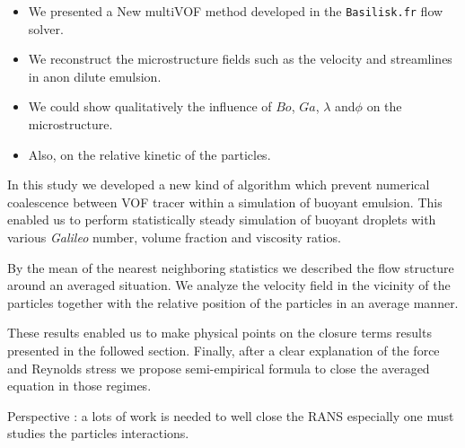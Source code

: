 

\begin{itemize}
    \item We presented a New multiVOF method developed in the \texttt{Basilisk.fr} flow solver. 
    \item We reconstruct the microstructure fields such as the velocity and streamlines in  anon dilute emulsion. 
    \item We could show qualitatively the influence of $Bo$, $Ga$, $\lambda$ and$\phi$ on the microstructure.
    \item Also, on the relative kinetic of the particles.  
\end{itemize}

In this study we developed a new kind of algorithm which prevent numerical coalescence between VOF tracer within a simulation of buoyant emulsion. 
This enabled us to perform statistically steady simulation of buoyant droplets with various \textit{Galileo} number, volume fraction and viscosity ratios. 

By the mean of the nearest neighboring statistics we described the flow structure around an averaged situation. 
We analyze the velocity field in the vicinity of the particles together with the relative position of the particles in an average manner. 

These results enabled us to make physical points on the closure terms results presented in the followed section. 
Finally, after a clear explanation of the force and Reynolds stress we propose semi-empirical formula to close the averaged equation in those regimes. 

Perspective : a lots of work is needed to well close the RANS especially one must studies the particles interactions. 
